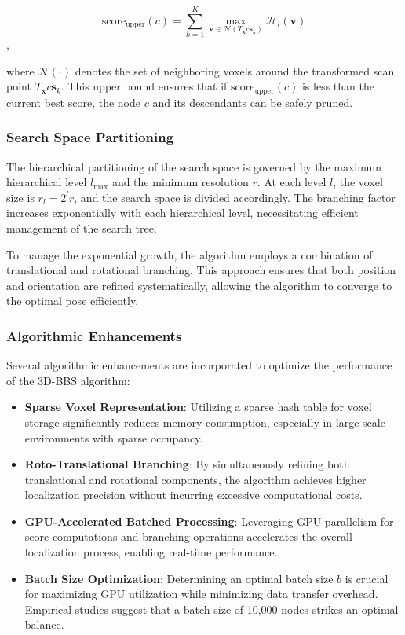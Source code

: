 $$\text{score}_{\text{upper}}(c) = \sum_{k=1}^{K} \max_{\mathbf{v} \in \mathcal{N}(T_{\mathbf{x}}c \mathbf{s}_k)} \mathcal{H}_l(\mathbf{v})$$,

where $\mathcal{N}(\cdot)$ denotes the set of neighboring voxels around the transformed scan point $T_{\mathbf{x}}c \mathbf{s}_k$. This upper bound ensures that if $\text{score}_{\text{upper}}(c)$ is less than the current best score, the node $c$ and its descendants can be safely pruned.

\subsubsection{Search Space Partitioning}
The hierarchical partitioning of the search space is governed by the maximum hierarchical level $l_{\text{max}}$ and the minimum resolution $r$. At each level $l$, the voxel size is $r_l = 2^l r$, and the search space is divided accordingly. The branching factor increases exponentially with each hierarchical level, necessitating efficient management of the search tree.

To manage the exponential growth, the algorithm employs a combination of translational and rotational branching. This approach ensures that both position and orientation are refined systematically, allowing the algorithm to converge to the optimal pose efficiently.

\subsubsection{Algorithmic Enhancements}
Several algorithmic enhancements are incorporated to optimize the performance of the 3D-BBS algorithm:

\begin{itemize}
    \item \textbf{Sparse Voxel Representation}: Utilizing a sparse hash table for voxel storage significantly reduces memory consumption, especially in large-scale environments with sparse occupancy.
    \item \textbf{Roto-Translational Branching}: By simultaneously refining both translational and rotational components, the algorithm achieves higher localization precision without incurring excessive computational costs.
    \item \textbf{GPU-Accelerated Batched Processing}: Leveraging GPU parallelism for score computations and branching operations accelerates the overall localization process, enabling real-time performance.
    \item \textbf{Batch Size Optimization}: Determining an optimal batch size $b$ is crucial for maximizing GPU utilization while minimizing data transfer overhead. Empirical studies suggest that a batch size of 10,000 nodes strikes an optimal balance.
\end{itemize}


